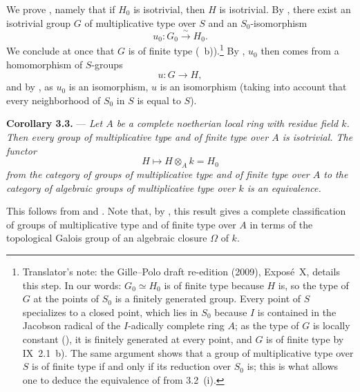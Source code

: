 We prove , namely that if \(H_0\) is isotrivial, then \(H\) is
isotrivial. By , there exist an isotrivial group \(G\) of
multiplicative type over \(S\) and an \(S_0\)-isomorphism
\[
  u_0:G_0\xrightarrow{\sim}H_0.
\]
We conclude at once that \(G\) is of finite type
(~b)).\footnote{Translator's note: the Gille--Polo draft
re-edition (2009), Expos\'e~X, details this step. In our words:
\(G_0\simeq H_0\) is of finite type because \(H\) is, so the type of
\(G\) at the points of \(S_0\) is a finitely generated group. Every
point of \(S\) specializes to a closed point, which lies in \(S_0\)
because \(I\) is contained in the Jacobson radical of the \(I\)-adically
complete ring \(A\); as the type of \(G\) is locally constant
(), it is finitely generated at every
point, and \(G\) is of finite type by IX~2.1~b). The same argument shows
that a group of multiplicative type over \(S\) is of finite type if and
only if its reduction over \(S_0\) is; this is what allows one to
deduce the equivalence of  from 3.2~(i).} By , \(u_0\) then comes from a homomorphism of
\(S\)-groups
\[
  u:G\longrightarrow H,
\]
and by , as \(u_0\) is an isomorphism, \(u\) is an
isomorphism (taking into account that every neighborhood of \(S_0\) in
\(S\) is equal to \(S\)).

\medskip
\noindent{}%
\textbf{Corollary 3.3.} ---
\textit{Let \(A\) be a complete noetherian local ring with residue
field \(k\). Then every group of multiplicative type and of finite type
over \(A\) is isotrivial. The functor
\[
  H\longmapsto H\otimes_A k=H_0
\]
from the category of groups of multiplicative type and of finite type
over \(A\) to the category of algebraic groups of multiplicative type
over \(k\) is an equivalence.}

This follows from  and . Note that, by , this result gives a
complete classification of groups of multiplicative type and of finite
type over \(A\) in terms of the topological Galois group of an algebraic
closure \(\Omega\) of \(k\).

